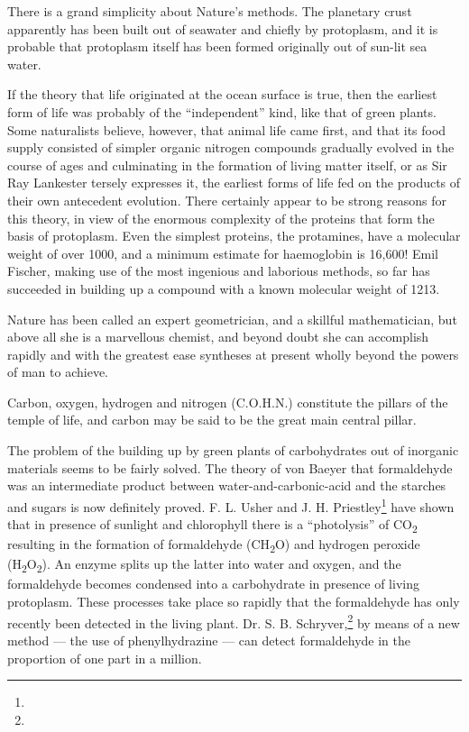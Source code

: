 \documentclass[a4paper, 12pt, oneside]{article}
\begin{document}
There is a grand simplicity about Nature's methods. The planetary crust apparently has been built out of seawater and chiefly by protoplasm, and it is probable that protoplasm itself has been formed originally out of sun-lit sea water.

If the theory that life originated at the ocean surface is true, then the earliest form of life was probably of the ``independent'' kind, like that of green plants. Some naturalists believe, however, that animal life came first, and that its food supply consisted of simpler organic nitrogen compounds gradually evolved in the course of ages and culminating in the formation of living matter itself, or as Sir Ray Lankester tersely expresses it, the earliest forms of life fed on the products of their own antecedent evolution. There certainly appear to be strong reasons for this theory, in view of the enormous complexity of the proteins that form the basis of protoplasm. Even the simplest proteins, the protamines, have a molecular weight of over 1000, and a minimum estimate for haemoglobin is 16,600! Emil Fischer, making use of the most ingenious and laborious methods, so far has succeeded in building up a compound with a known molecular weight of 1213.

Nature has been called an expert geometrician, and a skillful mathematician, but above all she is a marvellous chemist, and beyond doubt she can accomplish rapidly and with the greatest ease syntheses at present wholly beyond the powers of man to achieve.

Carbon, oxygen, hydrogen and nitrogen (C.O.H.N.) constitute the pillars of the temple of life, and carbon may be said to be the great main central pillar.

The problem of the building up by green plants of carbohydrates out of inorganic materials seems to be fairly solved. The theory of von Baeyer that formaldehyde was an intermediate product between water-and-carbonic-acid and the starches and sugars is now definitely proved. F. L. Usher and J. H. Priestley\footnote{} have shown that in presence of sunlight and chlorophyll there is a ``photolysis'' of CO\textsubscript{2} resulting in the formation of formaldehyde (CH\textsubscript{2}O) and hydrogen peroxide (H\textsubscript{2}O\textsubscript{2}). An enzyme splits up the latter into water and oxygen, and the formaldehyde becomes condensed into a carbohydrate in presence of living protoplasm. These processes take place so rapidly that the formaldehyde has only recently been detected in the living plant. Dr. S. B. Schryver,\footnote{} by means of a new method --- the use of phenylhydrazine --- can detect formaldehyde in the proportion of one part in a million.
\end{document}
